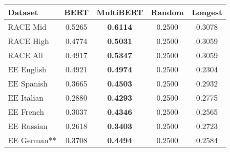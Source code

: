{\centering
\begin{tabular}{l|c|c|c|c}
  \hline
  Dataset             & BERT     & MultiBERT        & Random   & Longest  \\ \hline
  RACE Mid            &  0.5265  & \textbf{0.6114}  & 0.2500   & 0.3078   \\
  RACE High           &  0.4774  & \textbf{0.5031}  & 0.2500   & 0.3059   \\
  RACE All            &  0.4917  & \textbf{0.5347}  & 0.2500   & 0.3059   \\ \hline
  EE English          &  0.4921  & \textbf{0.4974}  & 0.2500   & 0.2304   \\
  EE Spanish          &  0.3665  & \textbf{0.4503}  & 0.2500   & 0.2932   \\
  EE Italian          &  0.2880  & \textbf{0.4293}  & 0.2500   & 0.2775   \\
  EE French           &  0.3037  & \textbf{0.4346}  & 0.2500   & 0.2565   \\
  EE Russian          &  0.2618  & \textbf{0.3403}  & 0.2500   & 0.2723   \\
  EE German**           &  0.3708  & \textbf{0.4494}  & 0.2500   & 0.2584   \\ \hline
\end{tabular}
}
